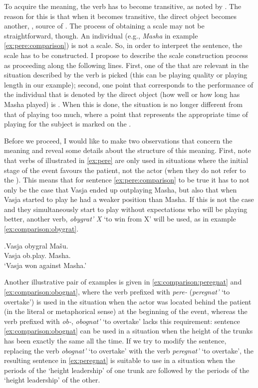 To acquire the  meaning, the verb has to become transitive, as noted by \citet{Shvedova:82}. The reason for this is that when it becomes transitive, the direct object becomes another, , source of . The process of obtaining a scale may not be straightforward, though. An individual (e.g., \textit{Masha} in example \ref{ex:pere:comparison}) is not a scale. So, in order to interpret the sentence, the scale has to be constructed. I propose to describe the scale construction process as proceeding along the following lines. First, one of the  that are relevant in the situation described by the verb is picked (this can be playing quality or playing length in our example); second, one point that corresponds to the performance of the individual that is denoted by the direct object (how well or how long has Masha played) is . When this is done, the situation is no longer different from that of playing too much, where a point that represents the appropriate time of playing for the subject is marked on the .

Before we proceed, I would like to make two observations that concern the  meaning and reveal some details about the structure of this meaning. First, note that verbs of  illustrated in \ref{ex:pere} are only used in situations where the initial stage of the event favours the patient, not the actor (when they do not refer to the ). This means that for sentence \ref{ex:pere:comparison} to be true it has to not only be the case that Vasja ended up outplaying Masha, but also that when Vasja started to play he had a weaker position than Masha. If this is not the case and they simultaneously start to play without expectations who will be playing better, another verb, \textit{obygrat' X} `to win from X' will be used, as in example \ref{ex:comparison:obygrat}. 

\exg.\label{ex:comparison:obygrat}Vasja obygral Ma\v{s}u.\\
Vasja ob.play. Masha.\\
\trans `Vasja won against Masha.'

Another illustrative pair of examples is given in \ref{ex:comparison:peregnat} and \ref{ex:comparison:obognat}, where the verb prefixed with \textit{pere-} (\textit{peregnat'} `to overtake') is used in the situation when the actor was located behind the patient (in the literal or metaphorical sense) at the beginning of the event, whereas the verb prefixed with {\textit{ob-},} \textit{obognat'} `to overtake' lacks this requirement: sentence \ref{ex:comparison:obognat} can be used in a situation when the height of the trunks has been exactly the same all the time. If we try to modify the sentence, replacing the verb \textit{obognat'} `to overtake' with the verb \textit{peregnat'} `to overtake', the resulting sentence in \ref{ex:peregnat} is suitable to use in a situation when the periods of the `height leadership' of one trunk are followed by the periods of the `height leadership' of the other.

